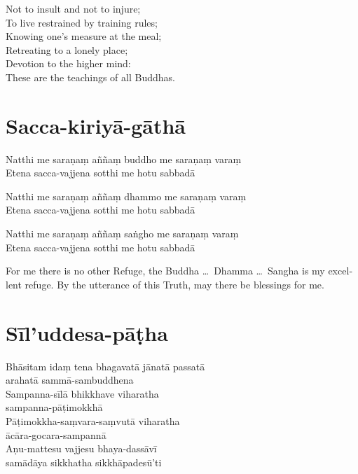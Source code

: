 Not to insult and not to injure;\\
To live restrained by training rules;\\
Knowing one's measure at the meal;\\
Retreating to a lonely place;\\
Devotion to the higher mind:\\
These are the teachings of all Buddhas.

\section{Sacca-kiriyā-gāthā}

\begin{leader}
\end{leader}


Natthi me saraṇaṃ aññaṃ buddho me saraṇaṃ varaṃ\\
Etena sacca-vajjena sotthi me hotu sabbadā

Natthi me saraṇaṃ aññaṃ dhammo me saraṇaṃ varaṃ\\
Etena sacca-vajjena sotthi me hotu sabbadā

Natthi me saraṇaṃ aññaṃ saṅgho me saraṇaṃ varaṃ\\
Etena sacca-vajjena sotthi me hotu sabbadā


\begin{english}
  For me there is no other Refuge, the Buddha \ldots\ Dhamma \ldots\ Sangha is
  my excellent refuge. By the utterance of this Truth, may there be blessings
  for me.
\end{english}

\section{Sīl'uddesa-pāṭha}

\begin{leader}
\end{leader}


Bhāsitam idaṃ tena bhagavatā jānatā passatā\\
arahatā sammā-sambuddhena\\
Sampanna-sīlā bhikkhave viharatha\\
sampanna-pāṭimokkhā\\
Pāṭimokkha-saṃvara-saṃvutā viharatha\\
ācāra-gocara-sampannā\\
Aṇu-mattesu vajjesu bhaya-dassāvī\\
samādāya sikkhatha sikkhāpadesū'ti

